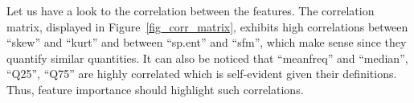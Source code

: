 Let us have a look to the correlation between the features. The correlation matrix, displayed in Figure~\ref{fig_corr_matrix}, exhibits high correlations between ``skew'' and ``kurt'' and between ``sp.ent'' and ``sfm'', which make sense since they quantify similar quantities. It can also be noticed that ``meanfreq'' and ``median'', ``Q25'', ``Q75'' are highly correlated which is self-evident given their definitions. 
Thus, feature importance should highlight such correlations.
\newlength{\BoxPlotFigWidth}
\newlength{\BoxPlotFigHeight}
\setlength{\BoxPlotFigWidth}{0.8\textwidth}
